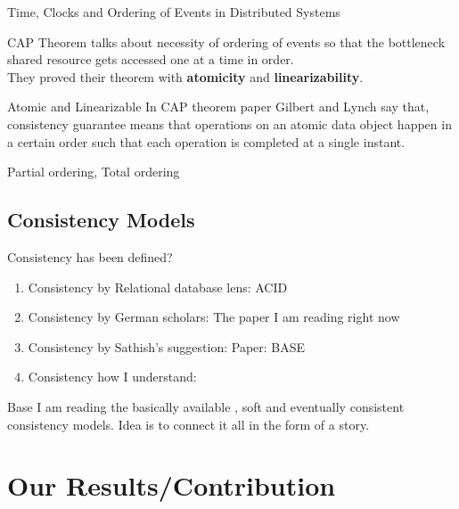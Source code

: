 \documentclass{beamer}
\begin{document}
\begin{frame}{Time, Clocks and Ordering of Events in Distributed Systems }

	CAP Theorem talks about necessity of ordering of events so that the bottleneck shared resource gets accessed one at a 	time in order.\\ They proved their theorem with \textbf{atomicity} and \textbf{linearizability}.

	Atomic and Linearizable  In CAP theorem paper Gilbert and Lynch say that, consistency guarantee means that operations on an atomic data object happen in a certain order such that each operation is completed at a single instant. 

\end{frame}

\begin{frame}
Partial ordering, Total ordering 
\end{frame}

\subsection{Consistency Models}

\begin{frame}{Consistency has been defined?}
\begin{enumerate}
	\item Consistency by Relational database lens: ACID
\item Consistency by German scholars: The paper I am reading right now
\item Consistency by Sathish's suggestion: Paper: {\huge BASE}
\item Consistency how I understand: 
\end{enumerate}

\end{frame}



\begin{frame}{Base}
	I am reading the basically available , soft and eventually consistent consistency models.
Idea is to connect it all in the form of a story.

\end{frame}




\section{Our Results/Contribution}
\end{document}
